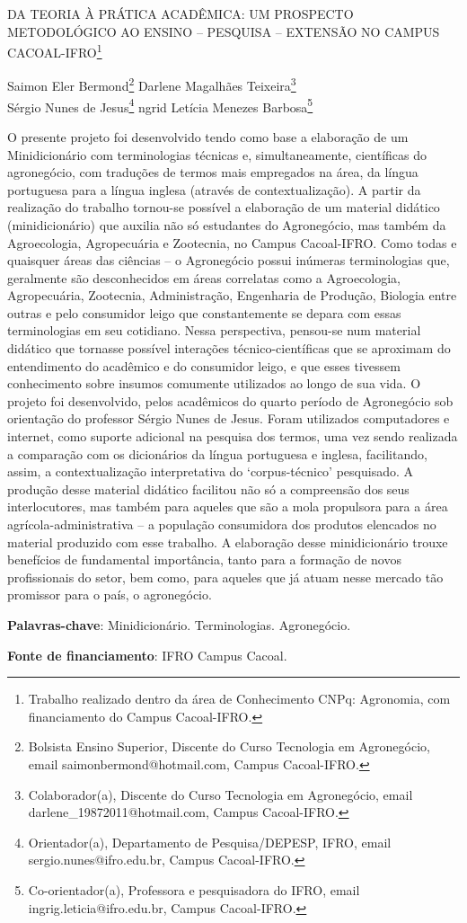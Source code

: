 \documentclass[article,12pt,onesidea,4paper,english,brazil]{abntex2}
\begin{document}
	
	
	\frenchspacing 
	
	\begin{center}
		\LARGE DA TEORIA À PRÁTICA ACADÊMICA: UM PROSPECTO METODOLÓGICO AO
		ENSINO – PESQUISA – EXTENSÃO NO CAMPUS CACOAL-IFRO\footnote{Trabalho realizado dentro da área de Conhecimento CNPq: Agronomia, com financiamento do
			Campus Cacoal-IFRO.}
		
		\normalsize
		Saimon Eler Bermond\footnote{Bolsista Ensino Superior, Discente do Curso Tecnologia em Agronegócio, email
			saimonbermond@hotmail.com, Campus Cacoal-IFRO.} 
		Darlene Magalhães Teixeira\footnote{Colaborador(a), Discente do Curso Tecnologia em Agronegócio, email
			darlene\_19872011@hotmail.com, Campus Cacoal-IFRO.} \\
		Sérgio Nunes de Jesus\footnote{Orientador(a), Departamento de Pesquisa/DEPESP, IFRO, email sergio.nunes@ifro.edu.br, Campus
			Cacoal-IFRO.} 
		ngrid Letícia
		Menezes Barbosa\footnote{Co-orientador(a), Professora e pesquisadora do IFRO, email ingrig.leticia@ifro.edu.br, Campus
			Cacoal-IFRO.} 
	\end{center}
	
	\noindent O presente projeto foi desenvolvido tendo como base a elaboração de um
	Minidicionário com terminologias técnicas e, simultaneamente, científicas do
	agronegócio, com traduções de termos mais empregados na área, da língua
	portuguesa para a língua inglesa (através de contextualização). A partir da
	realização do trabalho tornou-se possível a elaboração de um material didático
	(minidicionário) que auxilia não só estudantes do Agronegócio, mas também da
	Agroecologia, Agropecuária e Zootecnia, no Campus Cacoal-IFRO. Como todas e
	quaisquer áreas das ciências – o Agronegócio possui inúmeras terminologias que,
	geralmente são desconhecidos em áreas correlatas como a Agroecologia,
	Agropecuária, Zootecnia, Administração, Engenharia de Produção, Biologia entre
	outras e pelo consumidor leigo que constantemente se depara com essas
	terminologias em seu cotidiano. Nessa perspectiva, pensou-se num material didático
	que tornasse possível interações técnico-científicas que se aproximam do
	entendimento do acadêmico e do consumidor leigo, e que esses tivessem
	conhecimento sobre insumos comumente utilizados ao longo de sua vida. O projeto
	foi desenvolvido, pelos acadêmicos do quarto período de Agronegócio sob
	orientação do professor Sérgio Nunes de Jesus. Foram utilizados computadores e
	internet, como suporte adicional na pesquisa dos termos, uma vez sendo realizada a
	comparação com os dicionários da língua portuguesa e inglesa, facilitando, assim, a
	contextualização interpretativa do ‘corpus-técnico’ pesquisado. A produção desse
	material didático facilitou não só a compreensão dos seus interlocutores, mas
	também para aqueles que são a mola propulsora para a área agrícola-administrativa
	– a população consumidora dos produtos elencados no material produzido com esse
	trabalho. A elaboração desse minidicionário trouxe benefícios de fundamental
	importância, tanto para a formação de novos profissionais do setor, bem como, para
	aqueles que já atuam nesse mercado tão promissor para o país, o agronegócio.
	
	\vspace{\onelineskip}
	
	\noindent
	\textbf{Palavras-chave}: Minidicionário. Terminologias. Agronegócio. 
	
	\noindent
	\textbf{Fonte de financiamento}: IFRO Campus Cacoal. 
	
\end{document}
